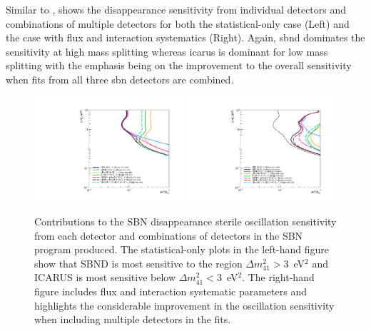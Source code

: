 \newpage
Similar to ,  shows the \nue disappearance sensitivity from individual detectors and combinations of multiple detectors for both the statistical-only case (Left) and the case with flux and interaction systematics (Right). Again, \gls{sbnd} dominates the sensitivity at high mass splitting whereas \gls{icarus} is dominant for low mass splitting with the emphasis being on the improvement to the overall sensitivity when fits from all three \gls{sbn} detectors are combined.

\begin{figure}[h!]
    \centering
    \includegraphics[width = 0.49\textwidth]{figures-chap6/exclusion_contours/nue_disapp_detector_combinations_stat-only.pdf}
    \includegraphics[width = 0.49\textwidth]{figures-chap6/exclusion_contours/nue_disapp_detector_combinations_stat+syst.pdf}
    \caption[\nue disappearance sensitivities from different detector combinations.]{Contributions to the SBN \nue disappearance sterile oscillation sensitivity from each detector and combinations of detectors in the SBN program produced. The statistical-only plots in the left-hand figure show that SBND is most sensitive to the region $\Delta m_{41}^{2} > 3$~eV$^{2}$ and ICARUS is most sensitive below $\Delta m_{41}^{2} < 3$~eV$^{2}$. The right-hand figure includes flux and interaction systematic parameters and highlights the considerable improvement in the oscillation sensitivity when including multiple detectors in the fits.}
    \label{fig:nue_disapp_sensitivity_detector_contribution}
\end{figure}


